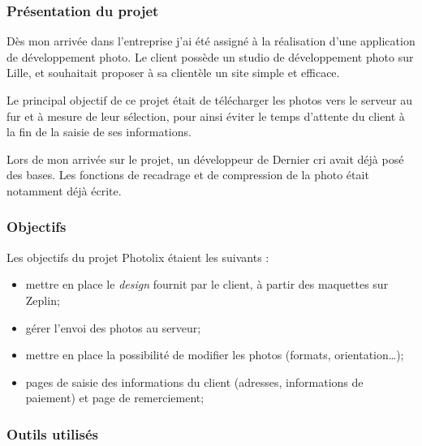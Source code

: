 \documentclass[12pt,a4paper]{article}
\providecommand{\tightlist}{%
  \setlength{\itemsep}{0pt}\setlength{\parskip}{0pt}}
\begin{document}
  \subsubsection{Présentation du projet}\label{pruxe9sentation-du-projet}

  \bigskip

  Dès mon arrivée dans l'entreprise j'ai été assigné à la réalisation
  d'une application de développement photo. Le client possède un studio de
  développement photo sur Lille, et souhaitait proposer à sa clientèle un
  site simple et efficace.

  \bigskip

  Le principal objectif de ce projet était de télécharger les photos vers
  le serveur au fur et à mesure de leur sélection, pour ainsi éviter le
  temps d'attente du client à la fin de la saisie de ses informations.

  \bigskip

  Lors de mon arrivée sur le projet, un développeur de Dernier cri avait
  déjà posé des bases. Les fonctions de recadrage et de compression de la
  photo était notamment déjà écrite.

  \bigskip

  \subsubsection{Objectifs}\label{objectifs}

  \bigskip

  Les objectifs du projet Photolix étaient les suivants :

  \begin{itemize}
  \tightlist
  \item
    mettre en place le \emph{design} fournit par le client, à partir des
    maquettes sur Zeplin;
  \item
    gérer l'envoi des photos au serveur;
  \item
    mettre en place la possibilité de modifier les photos (formats,
    orientation\ldots{});
  \item
    pages de saisie des informations du client (adresses, informations de
    paiement) et page de remerciement;
  \end{itemize}

  \bigskip

  \subsubsection{Outils utilisés}\label{outils-utilisuxe9s}
\end{document}
